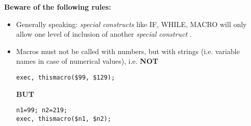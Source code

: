 {\bf Beware of the following rules:}
\begin{itemize}
   \item Generally speaking: \textit{ special constructs } like IF,
     WHILE, MACRO will only allow one level of inclusion of another
     \textit{ special construct }.
   \item  Macros must not be called with numbers, but with strings
     (i.e. variable names in case of numerical values), i.e. {\bf NOT }
\begin{verbatim}
exec, thismacro($99, $129);
\end{verbatim}
{\bf BUT}
\begin{verbatim}
n1=99; n2=219;
exec, thismacro($n1, $n2);
\end{verbatim}
\end{itemize}


